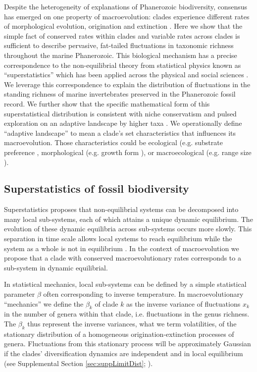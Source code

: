 \documentclass[12pt]{article}
\let\citep=\cite
\begin{document}
Despite the heterogeneity of explanations of Phanerozoic biodiversity,
consensus has emerged on one property of macroevolution: clades
experience different rates of morphological evolution, origination and
extinction \citep{simpson1953, sepkoski1984, holman1989, gilinsky1994,
  stadler2011, rabosky2014}. Here we show that the simple fact of
conserved rates within clades and variable rates across clades is
sufficient to describe pervasive, fat-tailed fluctuations in taxonomic
richness throughout the marine Phanerozoic.  This biological mechanism
has a precise correspondence to the non-equilibrial theory from
statistical physics known as ``superstatistics'' \citep{beck2003}
which has been applied across the physical and social sciences
\citep{beck2004, fuentes2009}. We leverage this correspondence to
explain the distribution of fluctuations in the standing richness of
marine invertebrates preserved in the Phanerozoic fossil record. We
further show that the specific mathematical form of this
superstatistical distribution is consistent with niche conservatism
\citep{roy2009range, hopkins2014} and pulsed exploration on an
adaptive landscape by higher taxa \citep{eldredgeGould1972,
  newman1985adaptive, hopkins2014}. We operationally define ``adaptive
landscape'' to mean a clade's set characteristics that influences its
macroevolution. Those characteristics could be ecological (e.g.
substrate preference \citep{bambach, hopkins2014}, morphological
(e.g. growth form \citep{jablonski}), or macroecological (e.g. range
size \citep{harnik2011, foote2008paleobiol}).



\subsection{Superstatistics of fossil biodiversity}




Superstatistics \citep{beck2003} proposes that non-equilibrial systems
can be decomposed into many local sub-systems, each of which attains a
unique dynamic equilibrium. The evolution of these dynamic equilibria
across sub-systems occurs more slowly. This separation in time scale
allows local systems to reach equilibrium while the system as a whole
is not in equilibrium \citep{beck2003}.  In the context of
macroevolution we propose that a clade with conserved
macroevolutionary rates corresponds to a sub-system in dynamic
equilibrial.

In statistical mechanics, local sub-systems can be defined by a simple
statistical parameter $\beta$ often corresponding to inverse
temperature. In macroevolutionary ``mechanics'' we define the
$\beta_k$ of clade $k$ as the inverse variance of fluctuations $x_k$
in the number of genera within that clade, i.e. fluctuations in the
genus richness.  The $\beta_k$ thus represent the inverse variances,
what we term volatilities, of the stationary distribution of a
homogeneous origination-extinction processes of genera. Fluctuations
from this stationary process will be approximately Gaussian if the
clades' diversification dynamics are independent and in local
equilibrium (see Supplemental Section \ref{sec:suppLimitDist};
\citep{keilson1970, grassmann1987}).
\end{document}

